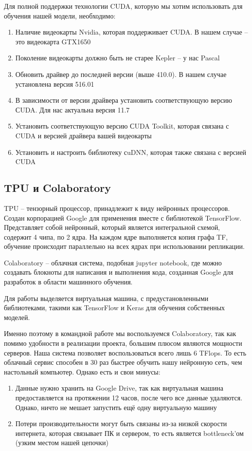 \documentclass[a4paper, 12pt]{report}
\begin{document}
Для полной поддержки технологии CUDA, которую мы хотим использовать для обучения нашей модели, необходимо:

\begin{enumerate}
  \item Наличие видеокарты Nvidia, которая поддерживает CUDA. В нашем случае – это видеокарта GTX1650
  \item Поколение видеокарты должно быть не старее Kepler – у нас Pascal
  \item Обновить драйвер до последней версии (выше 410.0). В нашем случае установлена версия 516.01
  \item В зависимости от версии драйвера установить соответствующую версию СUDA. Для нас актуальна версия 11.7
  \item Установить соответствующую версию СUDA Toolkit, которая связана с CUDA и версией драйвера вашей видеокарты
  \item Установить и настроить библиотеку сuDNN, которая также связана с версией CUDA
\end{enumerate}

\pagebreak
\subsection{TPU и Colaboratory}
TPU – тензорный процессор, принадлежит к виду нейронных процессоров. Создан корпорацией Google для применения вместе с библиотекой TensorFlow. Представляет собой нейронный, который является интегральной схемой, содержит 4 чипа, по 2 ядра. На каждом ядре выполняется копия графа TF, обучение происходит параллельно на всех ядрах при использовании репликации.

Colaboratory – облачная система, подобная jupyter notebook, где можно создавать блокноты для написания и выполнения кода, созданная Google для разработок в области машинного обучения.

Для работы выделяется виртуальная машина, с предустановленными библиотеками, такими как TensorFlow и Keras для обучения собственных моделей.

Именно поэтому в командной работе мы воспользуемся Colaboratory, так как помимо удобности в реализации проекта, большим плюсом являются мощности серверов. Наша система позволяет воспользоваться всего лишь 6 TFlops. То есть облачный сервис способен в 30 раз быстрее обучить нашу нейронную сеть, чем настольный компьютер. Однако есть и свои минусы:

\begin{enumerate}
  \item Данные нужно хранить на Google Drive, так как виртуальная машина предоставляется на протяжении 12 часов, после чего все данные удаляются. Однако, ничто не мешает запустить ещё одну виртуальную машину
  \item Потери производительности могут быть связаны из-за низкой скорости интернета, которая связывает ПК и сервером, то есть является bottleneck’ом (узким местом нашей цепочки)
\end{enumerate}
\end{document}
